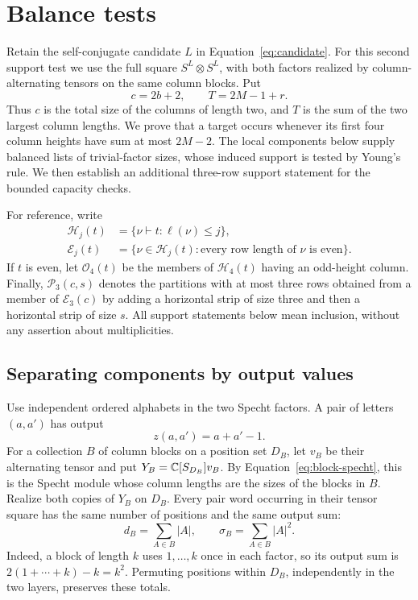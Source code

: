 \section{Balance tests}
\label{sec:balance}

Retain the self-conjugate candidate $L$ in
Equation~\eqref{eq:candidate}. For this second support test we use the
full square $S^L\otimes S^L$, with both factors realized by
column-alternating tensors on the same column blocks. Put
\[
 c=2b+2,\qquad T=2M-1+r.
\]
Thus $c$ is the total size of the columns of length two, and $T$ is
the sum of the two largest column lengths. We prove that a target
occurs whenever its first four column heights have sum at most
$2M-2$. The local components below supply balanced lists of
trivial-factor sizes, whose induced support is tested by Young's
rule. We then establish an additional three-row support statement
for the bounded capacity checks.

For reference, write
\begin{align*}
 \mathcal H_j(t)&=\{\nu\vdash t:\ell(\nu)\le j\},\\
 \mathcal E_j(t)&=\{\nu\in\mathcal H_j(t):
                         \text{every row length of $\nu$ is even}\}.
\end{align*}
If $t$ is even, let $\mathcal O_4(t)$ be the members of
$\mathcal H_4(t)$ having an odd-height column.  Finally,
$\mathcal P_3(c,s)$ denotes the partitions with at most three rows
obtained from a member of $\mathcal E_3(c)$ by adding a horizontal
strip of size three and then a horizontal strip of size $s$.
All support statements below mean inclusion, without any assertion
about multiplicities.

\subsection{Separating components by output values}

Use independent ordered alphabets in the two Specht factors.
A pair of letters $(a,a')$ has output
\[
 z(a,a')=a+a'-1.
\]
For a collection $B$ of column blocks on a position set $D_B$, let
$v_B$ be their alternating tensor and put
$Y_B=\mathbb C[S_{D_B}]v_B$. By Equation~\eqref{eq:block-specht}, this is
the Specht module whose column lengths are the sizes of the blocks
in $B$. Realize both copies of $Y_B$ on $D_B$. Every pair word
occurring in their tensor square has the same number of positions
and the same output sum:
\begin{equation}
 d_B=\sum_{A\in B}|A|,
 \qquad
 \sigma_B=\sum_{A\in B}|A|^2.
 \label{bal:fixed-sums}
\end{equation}
Indeed, a block of length $k$ uses $1,\ldots,k$ once in each
factor, so its output sum is $2(1+\cdots+k)-k=k^2$. Permuting
positions within $D_B$, independently in the two layers, preserves
these totals.

